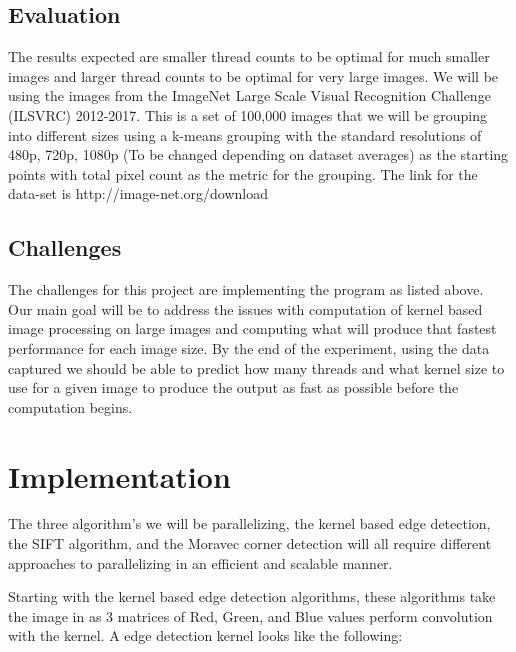 \documentclass{article}
\begin{document}
\begin{multicols}{2}
\begin{itemize}
                \end{itemize}
            
            \subsection{Evaluation}
                The results expected are smaller thread counts to be optimal for much smaller images and larger thread counts to be optimal for very large images.  We will be using the images from the  ImageNet Large Scale Visual Recognition Challenge (ILSVRC) 2012-2017.  This is a set of 100,000 images that we will be grouping into different sizes using a k-means grouping with the standard resolutions of 480p, 720p, 1080p (To be changed depending on dataset averages) as the starting points with total pixel count as the metric for the grouping.  The link for the data-set is http://image-net.org/download
                
            \subsection{Challenges}
                The challenges for this project are implementing the program as listed above.  Our main goal will be to address the issues with computation of kernel based image processing on large images and computing what will produce that fastest performance for each image size.  By the end of the experiment, using the data captured we should be able to predict how many threads and what kernel size to use for a given image to produce the output as fast as possible before the computation begins.
                
            \end{multicols}
            
        \pagebreak
    
    \section{Implementation}
        The three algorithm's we will be parallelizing, the kernel based edge detection, the SIFT algorithm, and the Moravec corner detection will all require different approaches to parallelizing in an efficient and scalable manner.
        
        Starting with the kernel based edge detection algorithms, these algorithms take the image in as 3 matrices of Red, Green, and Blue values perform convolution with the kernel.  A edge detection kernel looks like the following:\\\\
        
\end{document}
